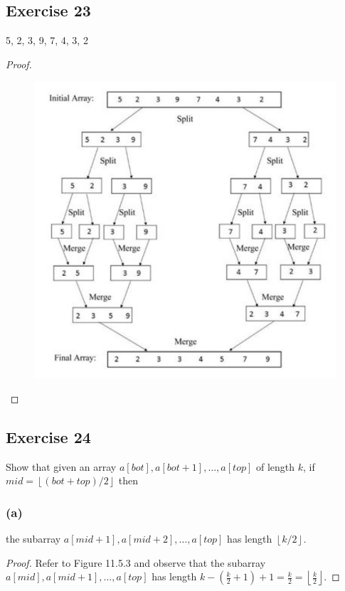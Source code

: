 \documentclass[14pt]{extarticle}
\newcommand{\floor}[1]{{\left\lfloor#1\right\rfloor}}
\begin{document}
\subsection{Exercise 23}
5, 2, 3, 9, 7, 4, 3, 2

\begin{proof}
    \begin{figure}[ht!]
        \centering
        \includegraphics[scale=0.4]{../images/11.5.23.png}
    \end{figure}
\end{proof}

\subsection{Exercise 24}
Show that given an array \(a[bot], a[bot + 1], \ldots, a[top]\) of length \(k\), if \(mid = \floor{(bot + top)/2}\) then

\subsubsection{(a)}
the subarray \(a[mid + 1], a[mid + 2], \ldots, a[top]\) has length \(\floor{k/2}\).

\begin{proof}
    Refer to Figure 11.5.3 and observe that the subarray \(a[mid], a[mid + 1], \ldots, a[top]\) has length \(k - (\frac{k}{2} +
    1) + 1 = \frac{k}{2} = \floor{\frac{k}{2}}\).
\end{proof}
\end{document}
